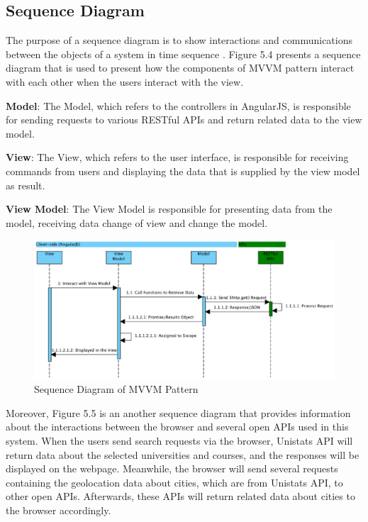 \subsection{Sequence Diagram}
The purpose of a sequence diagram is to show interactions and communications between the objects of a system in time sequence \cite{IBM2}. Figure 5.4 presents a sequence diagram that is used to present how the components of MVVM pattern interact with each other when the users interact with the view.

\textbf{Model}: The Model, which refers to the controllers in AngularJS, is responsible for sending requests to various RESTful APIs and return related data to the view model.

\textbf{View}: The View, which refers to the user interface, is responsible for receiving commands from users and displaying the data that is supplied by the view model as result. 

\textbf{View Model}: The View Model is responsible for presenting data from the model, receiving data change of view and change the model.



\begin{figure}[H]
  \centering
  \includegraphics[width=16cm]{./img/Picture10}
  \caption{Sequence Diagram of MVVM Pattern}
  \label{Figure:figex}
\end{figure}



Moreover, Figure 5.5 is an another sequence diagram that provides information about the interactions between the browser and several open APIs used in this system. When the users send search requests via the browser, Unistats API will return data about the selected universities and courses, and the responses will be displayed on the webpage. Meanwhile, the browser will send several requests containing the geolocation data about cities, which are from Unistats API, to other open APIs. Afterwards, these APIs will return related data about cities to the browser accordingly.



